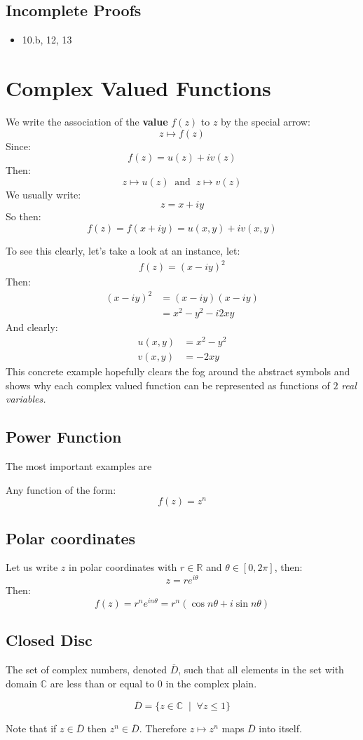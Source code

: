 \subsection{Incomplete Proofs}
\begin{itemize}
	\item 10.b, 12, 13
\end{itemize}

\section{Complex Valued Functions}
We write the association of the \textbf{value} $f(z)$ to $z$ by the special arrow:
\[z \mapsto f(z) \]
Since:
\[f(z) = u(z) +iv(z)\]
Then:
\[z \mapsto u(z) \;\; \text{and} \;\;  z \mapsto v(z) \]
We usually write:
\[z = x + iy\]
So then:
\[f(z) = f(x + iy) = u(x,y) + iv(x,y)\]

To see this clearly, let's take a look at an instance, let:
\begin{align*}
	f(z) = (x - iy)^2
\end{align*}
Then:
\begin{align*}
	(x - iy)^2 &= (x - iy)(x - iy) \\
	&= x^2 - y^2 - i2xy
\end{align*}
And clearly:
\begin{align*}
	u(x, y) &= x^2 - y^2 \\
	v(x, y) &= -2xy
\end{align*}
This concrete example hopefully clears the fog around the abstract symbols and 
shows why each complex valued function can be represented as functions of $2$ \textit{real variables.} 


\subsection{Power Function}
The most important examples are 
\begin{defn}
Any function of the form:
	\[f(z) = z^n\]
\end{defn}
\subsection{Polar coordinates}
Let us write $z$ in polar coordinates with $r \in \mathbb{R}$ and $\theta \in [0, 2\pi]$, then:
\[ z = re^{i\theta}\]
Then:
\[f(z) = r^ne^{in\theta} = r^n(\cos{n\theta} + i\sin{n\theta})\]

\subsection{Closed Disc}
The set of complex numbers, denoted $\overline{D}$, such that all elements in the set with domain $\mathbb{C}$ are less than or equal to $0$ in the complex plain.
\begin{defn}
	\[\overline{D} = \{z \in \mathbb{C} \;\;|\;\; \forall z \leq 1 \} \]
\end{defn}
Note that if $z \in \overline{D}$ then $z^n \in \overline{D}$. Therefore $z \mapsto z^n$ maps $\overline{D}$ into itself. \\

